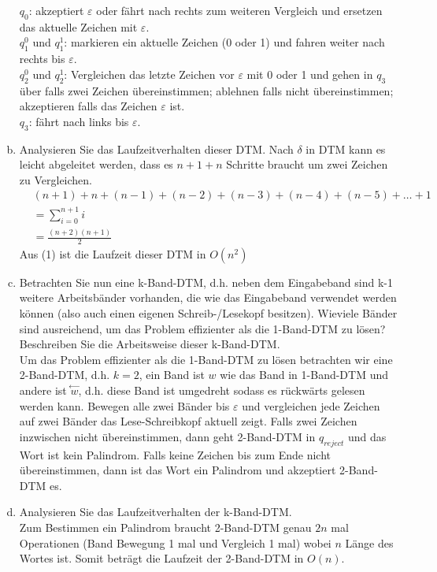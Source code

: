 \documentclass{article}
\begin{document}
\begin{flushleft}
\begin{enumerate}[(a)]
    $q_0$: akzeptiert $\varepsilon$ oder fährt nach rechts zum weiteren Vergleich und ersetzen das aktuelle Zeichen mit $\varepsilon$. \\
    $q_1^0$ und $q_1^1$: markieren ein aktuelle Zeichen (0 oder 1) und fahren weiter nach rechts bis $\varepsilon$. \\
    $q_2^0$ und $q_2^1$: Vergleichen das letzte Zeichen vor $\varepsilon$ mit 0 oder 1 und gehen in $q_3$ über falls zwei 
    Zeichen übereinstimmen; ablehnen falls nicht übereinstimmen; akzeptieren falls das Zeichen $\varepsilon$ ist. \\
    $q_3$: fährt nach links bis $\varepsilon$. \\
    \item Analysieren Sie das Laufzeitverhalten dieser DTM.
    \newline
    Nach $\delta$ in DTM kann es leicht abgeleitet werden, dass es $n + 1 + n$ Schritte braucht um zwei Zeichen zu Vergleichen.
    \begin{equation}
        \begin{aligned}
            &(n + 1) + n + (n - 1) + (n - 2) + (n - 3) + (n - 4) + (n - 5) + \dots + 1 \\
            & = \sum_{i = 0}^{n+1} i \\
            & = \frac{(n + 2)(n + 1)}{2}
        \end{aligned}
    \end{equation}
    Aus (1) ist die Laufzeit dieser DTM in $O(n^2)$ 
    \item Betrachten Sie nun eine k-Band-DTM, d.h. neben dem Eingabeband sind k-1 weitere Arbeitsbänder vorhanden, die 
    wie das Eingabeband verwendet werden können (also auch einen eigenen Schreib-/Lesekopf besitzen). 
    Wieviele Bänder sind ausreichend, um das Problem effizienter als die 1-Band-DTM zu lösen? 
    Beschreiben Sie die Arbeitsweise dieser k-Band-DTM.
    \newline \\
    Um das Problem effizienter als die 1-Band-DTM zu lösen betrachten wir eine 2-Band-DTM, d.h. $k=2$, ein Band ist $w$ wie das Band in 1-Band-DTM und andere ist $\stackrel{\leftarrow}{w}$, 
    d.h. diese Band ist umgedreht sodass es rückwärts gelesen werden kann. Bewegen alle zwei Bänder bis $\varepsilon$ und vergleichen 
    jede Zeichen auf zwei Bänder das Lese-Schreibkopf aktuell zeigt. Falls zwei Zeichen inzwischen nicht übereinstimmen, 
    dann geht 2-Band-DTM in $q_{reject}$ und das Wort ist kein Palindrom. Falls keine Zeichen bis zum Ende nicht übereinstimmen, dann ist das Wort 
    ein Palindrom und akzeptiert 2-Band-DTM es.
    \item Analysieren Sie das Laufzeitverhalten der k-Band-DTM.
    \newline \\
    Zum Bestimmen ein Palindrom braucht 2-Band-DTM genau $2n$ mal Operationen (Band Bewegung 1 mal und Vergleich 1 mal) 
    wobei $n$ Länge des Wortes ist.
    Somit beträgt die Laufzeit der 2-Band-DTM in $O(n)$. 
\end{enumerate}
\end{flushleft}
\end{document}
